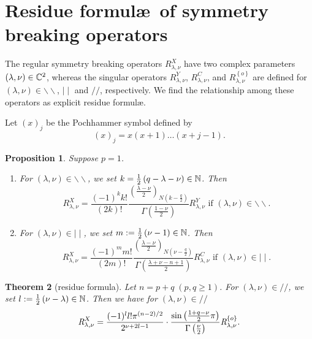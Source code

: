 \documentclass[reqno,12pt]{pja00} %
\newtheorem{theorem}{Theorem}[section]
\newtheorem{proposition}[theorem]{Proposition}
\theoremstyle{definition}
\theoremstyle{exampstyle} \newtheorem{examp}[theorem]{Theorem}
\newcommand{\OpR}{\mbox{\it R}}
\begin{document}
\section{Residue formul\ae\, of symmetry breaking operators}
The regular symmetry breaking operators $R_{\lambda,\nu}^X$ have two complex parameters $(\lambda,\nu)\in\mathbb{C}^2$, whereas the singular operators $R_{\lambda,\nu}^Y$, $R_{\lambda,\nu}^C$, and
$R_{\lambda,\nu}^{ \left\{ o \right\}}$ are defined
for $(\lambda,\nu)\in\backslash\backslash$, $\mid\mid$ and $//$, respectively. We find the relationship
among these operators as explicit residue formul\ae. 

Let $\left( x \right)_j$ be the Pochhammer symbol defined by
\begin{equation*}
	\left( x \right)_j=x(x+1)\dots(x+j-1).
\end{equation*}
\begin{proposition}\label{prop}
	Suppose $p=1$.\begin{enumerate}[(1)]
		\item For $(\lambda,\nu)\in\backslash\backslash$, we set $k=\frac{1}{2}\left( q-\lambda-\nu \right)\in\mathbb{N}$. Then
\begin{equation*}
R_{\lambda,\nu}^X=\frac{(-1)^kk!}{(2k)!}\frac{\left( \frac{\lambda-\nu}{2} \right)_{N\left(k-\frac{q}{2}  \right)}}{\Gamma\left( \frac{1-\nu}{2}\right) }R_{\lambda,\nu}^Y\mbox{ if }(\lambda,\nu)\in\backslash\backslash.
\end{equation*}
\item For $(\lambda,\nu)\in\mid\mid$, we set $m:=\frac{1}{2}\left( \nu-1 \right)\in\mathbb{N}$. Then
\begin{equation*}
R_{\lambda,\nu}^X=\frac{(-1)^mm!}{(2m)!}\frac{\left( \frac{\lambda-\nu}{2} \right)_{N\left( \nu-\frac{q}{2} \right)}}{\Gamma\left( \frac{\lambda+\nu-n+1}{2}\right)}R_{\lambda,\nu}^C\mbox{ if }(\lambda,\nu)\in\mid\mid.
\end{equation*}
	\end{enumerate}
\end{proposition}
\begin{theorem}[residue formula]
\label{thm:residue}
	Let $n=p+q\;(p,q\ge1)$.
	For $(\lambda,\nu)\in//$, we set $l:=\frac{1}{2}\left( \nu-\lambda \right)\in\mathbb{N}$. Then we have for $(\lambda,\nu)\in//$
  \[\OpR_{\lambda,\nu}^X  = \frac{ (- 1)^l l!\pi^{(n - 2) / 2} 
		}{2^{ \nu + 2 l-1}}\cdot  \frac{\sin\left( \frac{1+q-\nu}{2}\pi \right)}{\Gamma\left( \frac{\nu}{2} \right)}
	\OpR_{\lambda,\nu}^{ \left\{ o \right\} }. \]
	\end{theorem}
\end{document}
